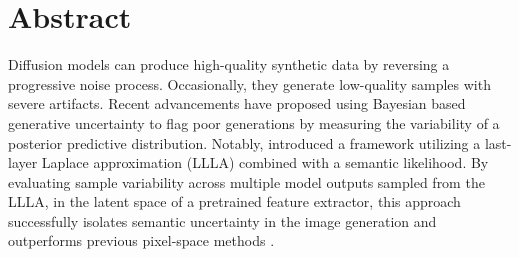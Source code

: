 \begingroup
\let\clearpage\relax
\let\cleardoublepage\relax
\let\cleardoublepage\relax

\chapter*{Abstract}

Diffusion models can produce high-quality synthetic data by reversing a progressive noise process. Occasionally, they generate low-quality samples with severe artifacts. Recent advancements have proposed using Bayesian based generative uncertainty to flag poor generations by measuring the variability of a posterior predictive distribution. Notably, \parencite{jazbec_generative_2025} introduced a framework utilizing a last-layer Laplace approximation (\acs{LLLA}) combined with a semantic likelihood. By evaluating sample variability across multiple model outputs sampled from the \acs{LLLA}, in the latent space of a pretrained feature extractor, this approach successfully isolates semantic uncertainty in the image generation and outperforms previous pixel-space methods \parencite{kou_bayesdiff_2024}.


